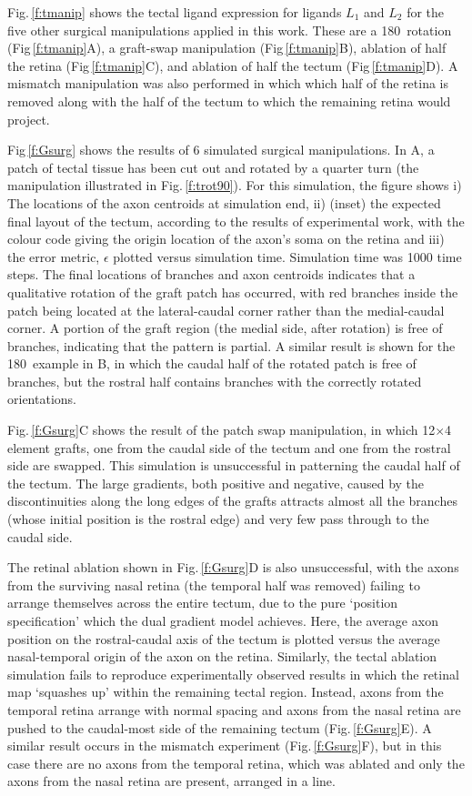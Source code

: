 \documentclass[11pt, a4paper, draft]{article}
\begin{document}
Fig.\,\ref{f:tmanip} shows the tectal ligand expression for ligands $L_1$ and
$L_2$ for the five other surgical manipulations applied in this work. These
are a 180\degree~rotation (Fig\,\ref{f:tmanip}A), a graft-swap manipulation
(Fig\,\ref{f:tmanip}B), ablation of half the retina (Fig\,\ref{f:tmanip}C),
and ablation of half the tectum (Fig\,\ref{f:tmanip}D). A mismatch
manipulation was also performed in which which half of the retina is removed
along with the half of the tectum to which the remaining retina would project.

Fig\,\ref{f:Gsurg} shows the results of 6 simulated surgical
manipulations. In A, a patch of tectal tissue has been cut out and rotated by
a quarter turn (the manipulation illustrated in Fig.\,\ref{f:trot90}). For
this simulation, the figure shows i) The locations of the axon centroids at
simulation end, ii) (inset) the expected final layout of the tectum, according
to the results of experimental work, with the colour code giving the origin
location of the axon's soma on the retina and iii) the error metric,
$\epsilon$ plotted versus simulation time. Simulation time was 1000 time
steps. The final locations of branches and axon centroids indicates that a
qualitative rotation of the graft patch has occurred, with red branches inside
the patch being located at the lateral-caudal corner rather than the
medial-caudal corner. A portion of the graft region (the medial side, after
rotation) is free of branches, indicating that the pattern is partial. A
similar result is shown for the 180\degree~example in B, in which the caudal
half of the rotated patch is free of branches, but the rostral half contains
branches with the correctly rotated orientations.

Fig.\,\ref{f:Gsurg}C shows the result of the patch swap manipulation, in
which 12$\times$4 element grafts, one from the caudal side of the tectum and one from
the rostral side are swapped. This simulation is unsuccessful in patterning
the caudal half of the tectum. The large gradients, both positive and
negative, caused by the discontinuities along the long edges of the grafts
attracts almost all the branches (whose initial position is the rostral edge)
and very few pass through to the caudal side.

The retinal ablation shown in Fig.\,\ref{f:Gsurg}D is also unsuccessful, with
the axons from the surviving nasal retina (the temporal half was removed)
failing to arrange themselves across the entire tectum, due to the pure
`position specification' which the dual gradient model achieves. Here, the
average axon position on the rostral-caudal axis of the tectum is plotted versus the average
nasal-temporal origin of the axon on the retina. Similarly,
the tectal ablation simulation fails to reproduce experimentally observed
results in which the retinal map `squashes up' within the remaining tectal
region. Instead, axons from the temporal retina arrange with normal spacing
and axons from the nasal retina are pushed to the caudal-most side of the
remaining tectum (Fig.\,\ref{f:Gsurg}E). A similar result occurs in the
mismatch experiment (Fig.\,\ref{f:Gsurg}F), but in this case there are no
axons from the temporal retina, which was ablated and only the axons
from the nasal retina are present, arranged in a line.
\end{document}
